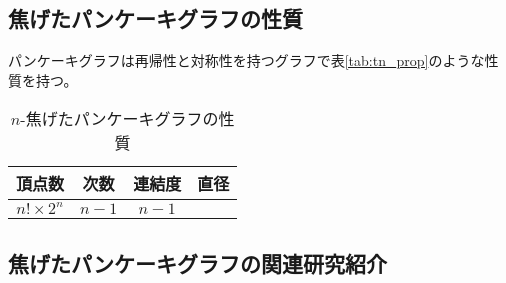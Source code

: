 \documentclass[11pt,a4j]{jsarticle}
\theoremstyle{plain}
\begin{document}
\subsection{焦げたパンケーキグラフの性質}
パンケーキグラフは再帰性と対称性を持つグラフで表\ref{tab:tn_prop}のような性質を持つ。
\begin{table}[httpb]
  \begin{center}
    \caption{$n$-焦げたパンケーキグラフの性質}
    \begin{tabular}{|c|c|c|c|} \hline
      頂点数&次数&連結度&直径 \\ \hline 
      $n!\times 2^n$ & $n-1$&$n-1$&\\ \hline
    \end{tabular}
        \label{tab:bpn_prop}
  \end{center}
\end{table}


\subsection{焦げたパンケーキグラフの関連研究紹介}

\end{document}

